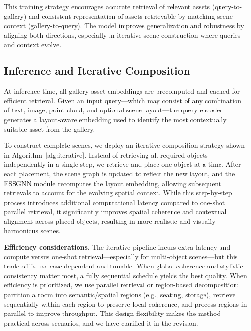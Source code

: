 This training strategy encourages accurate retrieval of relevant assets (query-to-gallery) and consistent representation of assets retrievable by matching scene context (gallery-to-query). The model improves generalization and robustness by aligning both directions, especially in iterative scene construction where queries and context evolve.



\subsection{Inference and Iterative Composition}
At inference time, all gallery asset embeddings are precomputed and cached for efficient retrieval. Given an input query—which may consist of any combination of text, image, point cloud, and optional scene layout—the query encoder generates a layout-aware embedding used to identify the most contextually suitable asset from the gallery. 

To construct complete scenes, we deploy an iterative composition strategy shown in Algorithm~\ref{alg:iterative}. Instead of retrieving all required objects independently in a single step, we retrieve and place one object at a time. After each placement, the scene graph is updated to reflect the new layout, and the ESSGNN module recomputes the layout embedding, allowing subsequent retrievals to account for the evolving spatial context. While this step-by-step process introduces additional computational latency compared to one-shot parallel retrieval, it significantly improves spatial coherence and contextual alignment across placed objects, resulting in more realistic and visually harmonious scenes.

\textbf{Efficiency considerations.} The iterative pipeline incurs extra latency and compute versus one-shot retrieval—especially for multi-object scenes—but this trade-off is use-case dependent and tunable. When global coherence and stylistic consistency matter most, a fully sequential schedule yields the best quality. When efficiency is prioritized, we use parallel retrieval or region-based decomposition: partition a room into semantic/spatial regions (e.g., seating, storage), retrieve sequentially within each region to preserve local coherence, and process regions in parallel to improve throughput. This design flexibility makes the method practical across scenarios, and we have clarified it in the revision.

